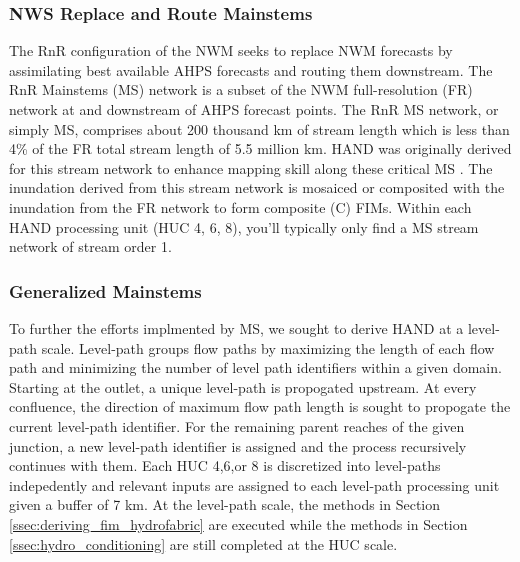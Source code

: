 \subsubsection{NWS Replace and Route Mainstems}
\label{ssec:unary_stream_order}
%
The RnR configuration of the NWM seeks to replace NWM forecasts by assimilating best available AHPS forecasts and routing them downstream.
The RnR Mainstems (MS) network is a subset of the NWM full-resolution (FR) network at and downstream of AHPS forecast points.
The RnR MS network, or simply MS, comprises about 200 thousand km of stream length which is less than 4\% of the FR total stream length of 5.5 million km.
HAND was originally derived for this stream network to enhance mapping skill along these critical MS \cite{djokic2019arc}. 
The inundation derived from this stream network is mosaiced or composited with the inundation from the FR network to form composite (C) FIMs. 
Within each HAND processing unit (HUC 4, 6, 8), you'll typically only find a MS stream network of stream order 1.
%
\subsubsection{Generalized Mainstems}
\label{ssec:unary_stream_order}
%
To further the efforts implmented by MS, we sought to derive HAND at a level-path scale.
Level-path groups flow paths by maximizing the length of each flow path and minimizing the number of level path identifiers within a given domain. 
Starting at the outlet, a unique level-path is propogated upstream. 
At every confluence, the direction of maximum flow path length is sought to propogate the current level-path identifier.
For the remaining parent reaches of the given junction, a new level-path identifier is assigned and the process recursively continues with them.
Each HUC 4,6,or 8 is discretized into level-paths indepedently and relevant inputs are assigned to each level-path processing unit given a buffer of 7 km.
At the level-path scale, the methods in Section \ref{ssec:deriving_fim_hydrofabric} are executed while the methods in Section \ref{ssec:hydro_conditioning} are still completed at the HUC scale.

%
